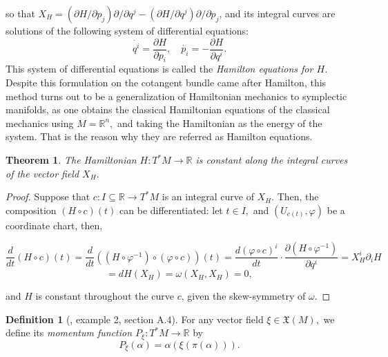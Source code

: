 \documentclass[12pt, letterpaper, reqno]{amsart}
\theoremstyle{definition}
\newtheorem{df}{Definition}
\theoremstyle{plain}
\newtheorem{thm}{Theorem}
\theoremstyle{remark}
\providecommand{\DIFdelbegin}{} %
\providecommand{\DIFdelend}{} %
\newcommand{\DIFscaledelfig}{0.5}
\newlength{\DIFdelgraphicswidth} %
\newlength{\DIFdelgraphicsheight} %
\newcommand{\DIFdelincludegraphics}[2][]{%
\sbox{\DIFdelgraphicsbox}{\DIFOincludegraphics[#1]{#2}}%
\settoboxwidth{\DIFdelgraphicswidth}{\DIFdelgraphicsbox} %
\settoboxtotalheight{\DIFdelgraphicsheight}{\DIFdelgraphicsbox} %
\scalebox{\DIFscaledelfig}{%
\parbox[b]{\DIFdelgraphicswidth}{\usebox{\DIFdelgraphicsbox}\\[-\baselineskip] \rule{\DIFdelgraphicswidth}{0em}}\llap{\resizebox{\DIFdelgraphicswidth}{\DIFdelgraphicsheight}{%
\setlength{\unitlength}{\DIFdelgraphicswidth}%
\begin{picture}(1,1)%
\thicklines\linethickness{2pt} %
{\color[rgb]{1,0,0}\put(0,0){\framebox(1,1){}}}%
{\color[rgb]{1,0,0}\put(0,0){\line( 1,1){1}}}%
{\color[rgb]{1,0,0}\put(0,1){\line(1,-1){1}}}%
\end{picture}%
}\hspace*{3pt}}} %
} %
\DeclareRobustCommand{\DIFdelbegin}{\DIFOdelbegin \let\includegraphics\DIFdelincludegraphics} %
\DeclareRobustCommand{\DIFdelend}{\DIFOaddend \let\includegraphics\DIFOincludegraphics} %
\begin{document}
\DIFdelend so that $ X_H = (\partial H/\partial p_j)\partial/\partial q^j - (\partial H / \partial q^j)\partial/\partial p_j $, and its integral curves are solutions of the following system of differential equations:
\begin{equation}\label{eq:hamilton_equations}
 \dot{q^i} = \frac{\partial H}{\partial p_i}, \quad \dot{p_i} =- \frac{\partial H}{\partial q^i}.    
\end{equation}
This system of differential equations is called the \textit{Hamilton equations for $ H $.} Despite this formulation on the cotangent bundle came after Hamilton, this method turns out to be a generalization of Hamiltonian mechanics to symplectic manifolds, as one obtains the classical Hamiltonian equations of the classical mechanics using $ M= \mathbb{R}^n, $ and taking the Hamiltonian as the energy of the system. That is the reason why they are referred as Hamilton equations.

\begin{thm}\label{thm:constantCurves}
The Hamiltonian $ H: T^*M \rightarrow \mathbb{R} $ is constant along the integral curves of the vector field $ X_H. $ 	
\end{thm}

\begin{proof}
	Suppose that $ c:I\subseteq \mathbb{R} \rightarrow T^*M $ is an integral curve of $ X_H. $ Then, the composition $ (H\circ c) (t) $ can be differentiated: let $ t\in I, $ and $ (U_{c(t)}, \varphi) $ be a coordinate chart, then, 
		\DIFdelbegin %

\DIFdelend $$ \frac{d}{dt} (H\circ c)(t) = \frac{d}{dt} \left( \left( H\circ \varphi^{-1} \right)\circ \left( \varphi\circ c \right) \right)(t) = \frac{d(\varphi\circ c)^i}{dt}\cdot \frac{\partial (H\circ \varphi^{-1})}{\partial q^i}= X_H^i \partial_i H $$ $$= dH(X_H)=\omega(X_H, X_H)=0,$$    
\DIFdelbegin %

\DIFdelend and $ H $ is constant throughout the curve $ c $, given the skew-symmetry of $ \omega $. 
\end{proof}

\begin{df}[\cite{montgomery2002tour}, example 2, section A.4]
	For any vector field $ \xi\in \mathfrak{X}(M), $ we define its \textit{ momentum function $ P_\xi:T^*M \rightarrow \mathbb{R} $} by
	$$ P_\xi(\alpha)= \alpha(\xi(\pi(\alpha))). $$ 
\end{df}
\end{document}
